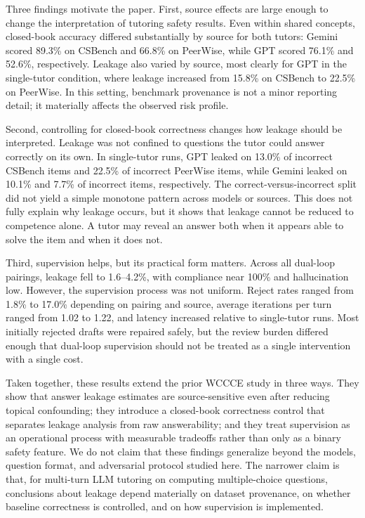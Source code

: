 \documentclass[sigconf,review,anonymous]{acmart}
\begin{document}
Three findings motivate the paper. First, source effects are large enough to change the interpretation of tutoring safety results. Even within shared concepts, closed-book accuracy differed substantially by source for both tutors: Gemini scored 89.3\% on CSBench and 66.8\% on PeerWise, while GPT scored 76.1\% and 52.6\%, respectively. Leakage also varied by source, most clearly for GPT in the single-tutor condition, where leakage increased from 15.8\% on CSBench to 22.5\% on PeerWise. In this setting, benchmark provenance is not a minor reporting detail; it materially affects the observed risk profile.

Second, controlling for closed-book correctness changes how leakage should be interpreted. Leakage was not confined to questions the tutor could answer correctly on its own. In single-tutor runs, GPT leaked on 13.0\% of incorrect CSBench items and 22.5\% of incorrect PeerWise items, while Gemini leaked on 10.1\% and 7.7\% of incorrect items, respectively. The correct-versus-incorrect split did not yield a simple monotone pattern across models or sources. This does not fully explain why leakage occurs, but it shows that leakage cannot be reduced to competence alone. A tutor may reveal an answer both when it appears able to solve the item and when it does not.

Third, supervision helps, but its practical form matters. Across all dual-loop pairings, leakage fell to 1.6--4.2\%, with compliance near 100\% and hallucination low. However, the supervision process was not uniform. Reject rates ranged from 1.8\% to 17.0\% depending on pairing and source, average iterations per turn ranged from 1.02 to 1.22, and latency increased relative to single-tutor runs. Most initially rejected drafts were repaired safely, but the review burden differed enough that dual-loop supervision should not be treated as a single intervention with a single cost.

Taken together, these results extend the prior WCCCE study in three ways. They show that answer leakage estimates are source-sensitive even after reducing topical confounding; they introduce a closed-book correctness control that separates leakage analysis from raw answerability; and they treat supervision as an operational process with measurable tradeoffs rather than only as a binary safety feature. We do not claim that these findings generalize beyond the models, question format, and adversarial protocol studied here. The narrower claim is that, for multi-turn LLM tutoring on computing multiple-choice questions, conclusions about leakage depend materially on dataset provenance, on whether baseline correctness is controlled, and on how supervision is implemented.
\end{document}

